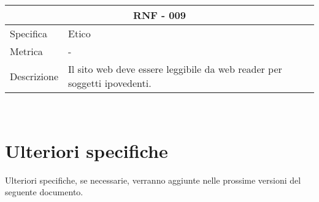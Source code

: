 \documentclass{article}
\begin{document}
\vspace{4mm} 
\begin{tabular}{ |p{3cm}|p{8cm}|  }
	\hline
	\multicolumn{2}{|c|}{\textbf{RNF - 009}} \\
	\hline
	Specifica&Etico \\
	\hline
	Metrica &  -\\
	\hline
	Descrizione&Il sito web deve essere leggibile da web reader per soggetti ipovedenti.\\
	\hline
\end{tabular}\\

\section{\textbf{Ulteriori specifiche}}
Ulteriori specifiche, se necessarie, verranno aggiunte nelle prossime versioni del seguente documento.
\end{document}
